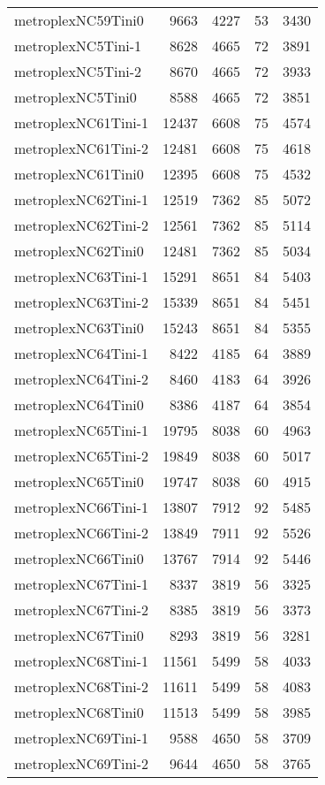 \begin{longtable}{lrrrr}
metroplexNC59Tini0 & 9663 & 4227 & 53 & 3430 \\
metroplexNC5Tini-1 & 8628 & 4665 & 72 & 3891 \\
metroplexNC5Tini-2 & 8670 & 4665 & 72 & 3933 \\
metroplexNC5Tini0 & 8588 & 4665 & 72 & 3851 \\
metroplexNC61Tini-1 & 12437 & 6608 & 75 & 4574 \\
metroplexNC61Tini-2 & 12481 & 6608 & 75 & 4618 \\
metroplexNC61Tini0 & 12395 & 6608 & 75 & 4532 \\
metroplexNC62Tini-1 & 12519 & 7362 & 85 & 5072 \\
metroplexNC62Tini-2 & 12561 & 7362 & 85 & 5114 \\
metroplexNC62Tini0 & 12481 & 7362 & 85 & 5034 \\
metroplexNC63Tini-1 & 15291 & 8651 & 84 & 5403 \\
metroplexNC63Tini-2 & 15339 & 8651 & 84 & 5451 \\
metroplexNC63Tini0 & 15243 & 8651 & 84 & 5355 \\
metroplexNC64Tini-1 & 8422 & 4185 & 64 & 3889 \\
metroplexNC64Tini-2 & 8460 & 4183 & 64 & 3926 \\
metroplexNC64Tini0 & 8386 & 4187 & 64 & 3854 \\
metroplexNC65Tini-1 & 19795 & 8038 & 60 & 4963 \\
metroplexNC65Tini-2 & 19849 & 8038 & 60 & 5017 \\
metroplexNC65Tini0 & 19747 & 8038 & 60 & 4915 \\
metroplexNC66Tini-1 & 13807 & 7912 & 92 & 5485 \\
metroplexNC66Tini-2 & 13849 & 7911 & 92 & 5526 \\
metroplexNC66Tini0 & 13767 & 7914 & 92 & 5446 \\
metroplexNC67Tini-1 & 8337 & 3819 & 56 & 3325 \\
metroplexNC67Tini-2 & 8385 & 3819 & 56 & 3373 \\
metroplexNC67Tini0 & 8293 & 3819 & 56 & 3281 \\
metroplexNC68Tini-1 & 11561 & 5499 & 58 & 4033 \\
metroplexNC68Tini-2 & 11611 & 5499 & 58 & 4083 \\
metroplexNC68Tini0 & 11513 & 5499 & 58 & 3985 \\
metroplexNC69Tini-1 & 9588 & 4650 & 58 & 3709 \\
metroplexNC69Tini-2 & 9644 & 4650 & 58 & 3765 \\

\end{longtable}

